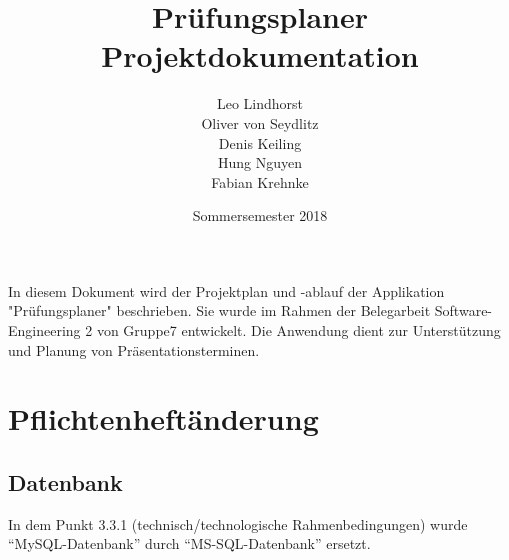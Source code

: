 \documentclass{scrartcl}
\begin{document}
	\title{Prüfungsplaner \\ Projektdokumentation}
	\author{Leo Lindhorst\\
			Oliver von Seydlitz\\
			Denis Keiling\\
			Hung Nguyen\\
			Fabian Krehnke}
	\date{Sommersemester 2018}
	\maketitle
	
	\tableofcontents
	
	In diesem Dokument wird der Projektplan und -ablauf der Applikation "Prüfungsplaner" beschrieben. Sie wurde im Rahmen der Belegarbeit Software-Engineering 2 von Gruppe7 entwickelt. Die Anwendung dient zur Unterstützung und Planung von Präsentationsterminen.
	
  
  
  
  
  \section{Pflichtenheftänderung}
  \subsection{Datenbank}
  In dem Punkt 3.3.1 (technisch/technologische Rahmenbedingungen) wurde “MySQL-Datenbank” durch “MS-SQL-Datenbank” ersetzt.
\end{document}
